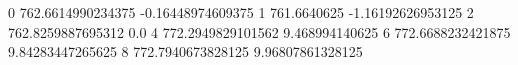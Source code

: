 0 762.6614990234375 -0.16448974609375
1 761.6640625 -1.16192626953125
2 762.8259887695312 0.0
4 772.2949829101562 9.468994140625
6 772.6688232421875 9.84283447265625
8 772.7940673828125 9.96807861328125
